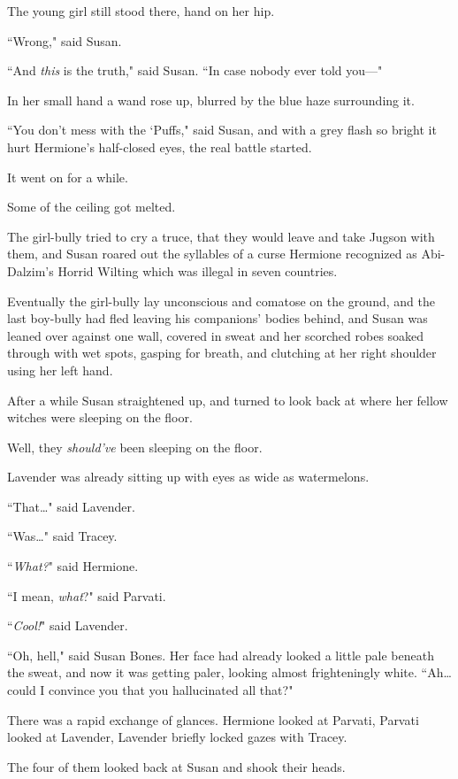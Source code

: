 The young girl still stood there, hand on her hip.

``Wrong," said Susan.

``And \emph{this} is the truth," said Susan. ``In case nobody ever told you—"

In her small hand a wand rose up, blurred by the blue haze surrounding it.

``You don't mess with the `Puffs," said Susan, and with a grey flash so bright it hurt Hermione's half-closed eyes, the real battle started.

It went on for a while.

Some of the ceiling got melted.

The girl-bully tried to cry a truce, that they would leave and take Jugson with them, and Susan roared out the syllables of a curse Hermione recognized as Abi-Dalzim's Horrid Wilting which was illegal in seven countries.

Eventually the girl-bully lay unconscious and comatose on the ground, and the last boy-bully had fled leaving his companions' bodies behind, and Susan was leaned over against one wall, covered in sweat and her scorched robes soaked through with wet spots, gasping for breath, and clutching at her right shoulder using her left hand.

After a while Susan straightened up, and turned to look back at where her fellow witches were sleeping on the floor.

Well, they \emph{should've} been sleeping on the floor.

Lavender was already sitting up with eyes as wide as watermelons.

``That{\ldots}" said Lavender.

``Was{\ldots}" said Tracey.

``\emph{What?}" said Hermione.

``I mean, \emph{what}?" said Parvati.

``\emph{Cool!}" said Lavender.

``Oh, hell," said Susan Bones. Her face had already looked a little pale beneath the sweat, and now it was getting paler, looking almost frighteningly white. ``Ah{\ldots} could I convince you that you hallucinated all that?"

There was a rapid exchange of glances. Hermione looked at Parvati, Parvati looked at Lavender, Lavender briefly locked gazes with Tracey.

The four of them looked back at Susan and shook their heads.


